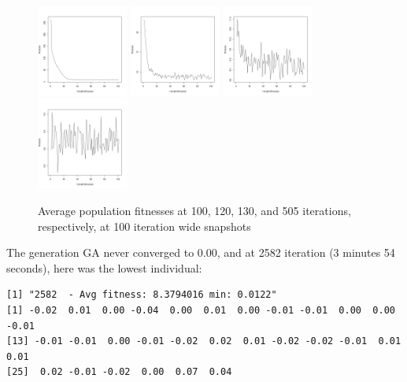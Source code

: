\documentclass[12pt]{article}
\begin{document}
\begin{figure}[!h]
        \begin{center}
		\includegraphics[width=30mm]{images/gen/avg_101.pdf}
		\includegraphics[width=30mm]{images/gen/avg_120.pdf}
		\includegraphics[width=30mm]{images/gen/avg_130.pdf}
		\includegraphics[width=30mm]{images/gen/avg_505.pdf}
               	\caption{Average population fitnesses at 100, 120, 130, and 505 iterations, respectively, at 100 iteration wide snapshots}
                \label{ss_avg_pop_fit}
        \end{center}
\end{figure}

The generation GA never converged to 0.00, and at 2582 iteration (3 minutes 54 seconds), here was the lowest individual:
\scriptsize
\begin{lstlisting}
[1] "2582  - Avg fitness: 8.3794016 min: 0.0122" 
[1] -0.02  0.01  0.00 -0.04  0.00  0.01  0.00 -0.01 -0.01  0.00  0.00 -0.01
[13] -0.01 -0.01  0.00 -0.01 -0.02  0.02  0.01 -0.02 -0.02 -0.01  0.01  0.01
[25]  0.02 -0.01 -0.02  0.00  0.07  0.04
\end{lstlisting}
\normalsize


\pagebreak
\end{document}
